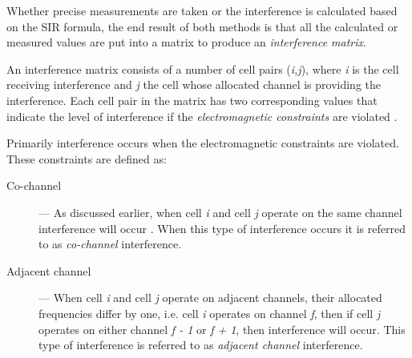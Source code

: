 Whether precise measurements are taken or the interference is calculated based on the SIR formula, the end result of both methods is that all the calculated or measured values are put into a matrix to produce an \emph{interference matrix}\cite{ACOvsEA}.

An interference matrix consists of a number of cell pairs (\emph{i,j}), where \emph{i} is the cell receiving interference and \emph{j} the cell whose allocated channel is providing the interference. Each cell pair in the matrix has two corresponding values that indicate the level of interference if the \emph{electromagnetic constraints} are violated \cite{Eisenblatter,Karen2004,ACOvsEA,AndreasPaper}. 

Primarily interference occurs when the electromagnetic constraints are violated. These constraints are defined as:
\begin{description}
\item[Co-channel] --- As discussed earlier, when cell \emph{i} and cell \emph{j} operate on the same channel interference will occur \cite{WirelessCommunications,WirelessDigitalCommunications,GSMSysEngin,PrinciplesMobileCommunication,Eisenblatter,EfficientEvoChannelManagement,Karen2004,ACOvsEA,InterferenceOrientatedFAP}. When this type of interference occurs it is referred to as \emph{co-channel} interference.
\item[Adjacent channel] --- When cell \emph{i} and cell \emph{j} operate on adjacent channels, their allocated frequencies differ by one, i.e. cell \emph{i} operates on channel \emph{f}, then if cell \emph{j} operates on either channel \emph{f - 1} or \emph{f + 1}, then interference will occur\cite{WirelessCommunications,WirelessDigitalCommunications,GSMSysEngin,PrinciplesMobileCommunication,Eisenblatter,EfficientEvoChannelManagement,Karen2004,ACOvsEA,InterferenceOrientatedFAP}. This type of interference is referred to as \emph{adjacent channel} interference.
\end{description}

